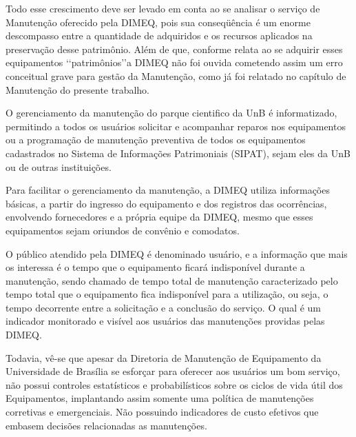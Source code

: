 Todo esse crescimento deve ser levado em conta ao se analisar o serviço de Manutenção oferecido pela DIMEQ, pois sua conseqüência é um enorme descompasso entre a quantidade de adquiridos e os recursos aplicados na preservação desse patrimônio. Além de que, conforme relata \cite{limacastilho2006} ao se adquirir esses equipamentos \lq\lq patrimônios\rq\rq a DIMEQ não foi ouvida cometendo assim um erro conceitual grave para gestão da Manutenção, como já foi relatado no capítulo de Manutenção do presente trabalho.
	
O gerenciamento da manutenção do parque cientifico da UnB é informatizado, permitindo a todos os usuários solicitar e acompanhar reparos nos equipamentos ou a programação de manutenção preventiva de todos os equipamentos cadastrados no Sistema de Informações Patrimoniais (SIPAT), sejam eles da UnB ou de outras instituições. 
	
Para facilitar o gerenciamento da manutenção, a DIMEQ utiliza informações básicas, a partir do ingresso do equipamento e dos registros das ocorrências, envolvendo fornecedores e a própria equipe da DIMEQ, mesmo que esses equipamentos sejam oriundos de convênio e comodatos.
	
O público atendido pela DIMEQ é denominado usuário, e a informação que mais os interessa é o tempo que o equipamento ficará indisponível durante a manutenção, sendo chamado de tempo total de manutenção caracterizado pelo tempo total que o equipamento fica indisponível para a utilização, ou seja, o tempo decorrente entre a solicitação e a conclusão do serviço. O qual é um indicador monitorado e visível aos usuários das manutenções providas pelas DIMEQ.

Todavia, vê-se que apesar da Diretoria de Manutenção de Equipamento da Universidade de Brasília se esforçar para oferecer aos usuários um bom serviço, não possui controles estatísticos e probabilísticos sobre os ciclos de vida útil dos Equipamentos, implantando assim somente uma política de manutenções corretivas e emergenciais. Não possuindo indicadores de custo efetivos que embasem decisões relacionadas as manutenções. 

